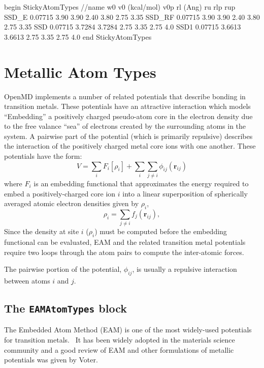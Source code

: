 \documentclass[letterpaper]{report}
\begin{document}
\begin{code}[caption={[An example of a StickyAtomTypes block.] A
simple example of a StickyAtomTypes block.  Distances ($r_l$, $r_u$,
$r_{l}'$ and $r_{u}'$) are given in \AA\ and energies ($v_0, v_{0}'$)
are in units of kcal/mol. $w_0$ is unitless.},
label={sch:StickyAtomTypes}]
begin StickyAtomTypes
//name  w0      v0 (kcal/mol)   v0p     rl (Ang)  ru    rlp     rup
SSD_E   0.07715 3.90            3.90    2.40      3.80  2.75    3.35
SSD_RF  0.07715 3.90            3.90    2.40      3.80  2.75    3.35
SSD     0.07715 3.7284          3.7284  2.75      3.35  2.75    4.0
SSD1    0.07715 3.6613          3.6613  2.75      3.35  2.75    4.0
end StickyAtomTypes
\end{code}

\section{\label{section::ffMetals}Metallic Atom Types} 

OpenMD implements a number of related potentials that describe
bonding in transition metals. These potentials have an attractive
interaction which models ``Embedding'' a positively charged
pseudo-atom core in the electron density due to the free valance
``sea'' of electrons created by the surrounding atoms in the system.
A pairwise part of the potential (which is primarily repulsive)
describes the interaction of the positively charged metal core ions
with one another.  These potentials have the form:
\begin{equation}
V  =  \sum_{i} F_{i}\left[\rho_{i}\right] + \sum_{i} \sum_{j \neq i}
\phi_{ij}(\mathbf{r}_{ij})
\end{equation}
where $F_{i} $ is an embedding functional that approximates the energy
required to embed a positively-charged core ion $i$ into a linear
superposition of spherically averaged atomic electron densities given
by $\rho_{i}$,
\begin{equation}
\rho_{i}   =  \sum_{j \neq i} f_{j}(\mathbf{r}_{ij}),
\end{equation}
Since the density at site $i$ ($\rho_i$) must be computed before the
embedding functional can be evaluated, EAM and the related
transition metal potentials require two loops through the atom pairs
to compute the inter-atomic forces.

The pairwise portion of the potential, $\phi_{ij}$, is usually a
repulsive interaction between atoms $i$ and $j$.

\subsection{\label{section:ffEAM}The {\tt EAMAtomTypes} block}
The Embedded Atom Method (EAM) is one of the most widely-used
potentials for transition
metals.~\cite{Finnis84,Ercolessi88,Chen90,Qi99,Ercolessi02,Daw84,FBD86,johnson89,Lu97,Wadley:2001fk,Zhou:2001fj,Zhou:2004yq,Zhou:2005rt}
It has been widely adopted in the materials science community and a
good review of EAM and other formulations of metallic potentials
was given by Voter.\cite{Voter:95}
\end{document}

